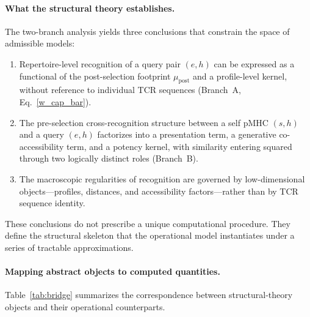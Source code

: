 \documentclass[11pt]{article}
\begin{document}
\paragraph{What the structural theory establishes.}
The two-branch analysis yields three conclusions that constrain the space of admissible models:
\begin{enumerate}[label=(\roman*),nosep]
  \item Repertoire-level recognition of a query pair \((e,h)\) can be expressed as a functional of the post-selection footprint \(\mu_{\mathrm{post}}\) and a profile-level kernel, without reference to individual TCR sequences (Branch~A, Eq.~\ref{w_cap_bar}).
  \item The pre-selection cross-recognition structure between a self pMHC \((s,h)\) and a query \((e,h)\) factorizes into a presentation term, a generative co-accessibility term, and a potency kernel, with similarity entering squared through two logically distinct roles (Branch~B).
  \item The macroscopic regularities of recognition are governed by low-dimensional objects---profiles, distances, and accessibility factors---rather than by TCR sequence identity.
\end{enumerate}

These conclusions do not prescribe a unique computational procedure. They define the structural skeleton that the operational model instantiates under a series of tractable approximations.

\paragraph{Mapping abstract objects to computed quantities.}
Table~\ref{tab:bridge} summarizes the correspondence between structural-theory objects and their operational counterparts.
\end{document}
